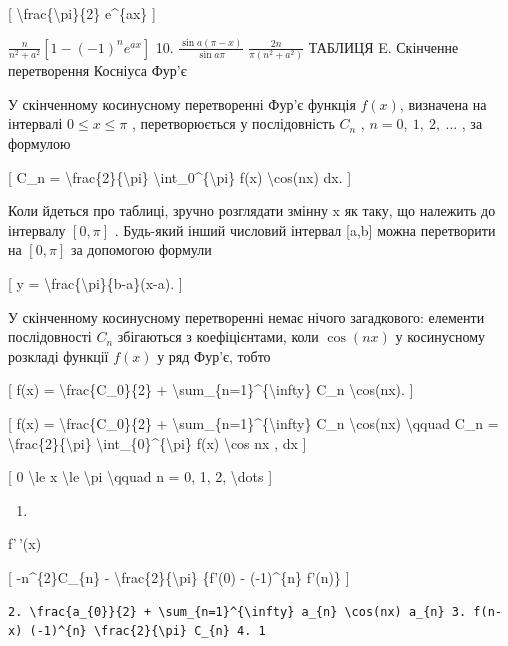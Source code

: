 \documentclass[
]{article}
\providecommand{\tightlist}{%
  \setlength{\itemsep}{0pt}\setlength{\parskip}{0pt}}
\begin{document}
{[} \textbackslash frac\{\textbackslash pi\}\{2\} e\^{}\{ax\} {]}

\(\frac{n}{n^2 + a^2} [1 - (-1)^n e^{ax}]\) 10.
\(\frac{\sin a (\pi - x)}{\sin a\pi}\) \(\frac{2n}{\pi (n^2 + a^2)}\)
ТАБЛИЦЯ E. Скінченне перетворення Косніуса Фур'є

У скінченному косинусному перетворенні Фур'є функція \(f(x)\), визначена
на інтервалі \(0 \le x \le \pi\) , перетворюється у послідовність
\(C_n\) , \(n=0,\ 1,\ 2,\ \ldots\) , за формулою

{[} C\_n = \textbackslash frac\{2\}\{\textbackslash pi\}
\textbackslash int\_0\^{}\{\textbackslash pi\} f(x)
\textbackslash cos(nx) dx. {]}

Коли йдеться про таблиці, зручно розглядати змінну x як таку, що
належить до інтервалу \([0,\pi]\) . Будь-який інший числовий інтервал
{[}a,b{]} можна перетворити на \([0,\pi]\) за допомогою формули

{[} y = \textbackslash frac\{\textbackslash pi\}\{b-a\}(x-a). {]}

У скінченному косинусному перетворенні немає нічого загадкового:
елементи послідовності \(C_n\) збігаються з коефіцієнтами, коли
\(\cos{(nx)}\) у косинусному розкладі функції \(f(x)\) у ряд Фур'є,
тобто

{[} f(x) = \textbackslash frac\{C\_0\}\{2\} +
\textbackslash sum\_\{n=1\}\^{}\{\textbackslash infty\} C\_n
\textbackslash cos(nx). {]}

{[} f(x) = \textbackslash frac\{C\_0\}\{2\} +
\textbackslash sum\_\{n=1\}\^{}\{\textbackslash infty\} C\_n
\textbackslash cos(nx) \textbackslash qquad C\_n =
\textbackslash frac\{2\}\{\textbackslash pi\}
\textbackslash int\_\{0\}\^{}\{\textbackslash pi\} f(x)
\textbackslash cos nx , dx {]}

{[} 0 \textbackslash le x \textbackslash le \textbackslash pi
\textbackslash qquad n = 0, 1, 2, \textbackslash dots {]}

\begin{enumerate}
\def\labelenumi{\arabic{enumi}.}
\tightlist
\item
\end{enumerate}

f'\,'(x)

{[} -n\^{}\{2\}C\_\{n\} - \textbackslash frac\{2\}\{\textbackslash pi\}
\{f'(0) - (-1)\^{}\{n\} f'(n)\} {]}

\begin{verbatim}
2. \frac{a_{0}}{2} + \sum_{n=1}^{\infty} a_{n} \cos(nx) a_{n} 3. f(n-x) (-1)^{n} \frac{2}{\pi} C_{n} 4. 1
\end{verbatim}
\end{document}
